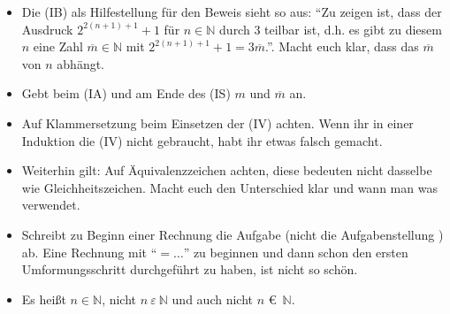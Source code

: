 \documentclass[11pt, a4paper]{article}
\newcommand{\N}{\mathbb{N}}
\begin{document}
\begin{itemize}
\item Die (IB) als Hilfestellung für den Beweis sieht so aus: \enquote{Zu zeigen ist, dass der Ausdruck $2^{2(n+1)+1}+1$ für $n \in \N$ durch 3 teilbar ist, d.h. es gibt zu diesem $n$ eine Zahl $\overline{m} \in \N$ mit $2^{2(n+1)+1}+1 = 3\overline{m}$.}. Macht euch klar, dass das $\overline{m}$ von $n$ abhängt. 

\item Gebt beim (IA) und am Ende des (IS) $m$ und $\overline{m}$ an.

\item Auf Klammersetzung beim Einsetzen der (IV) achten. Wenn ihr in einer Induktion die (IV) nicht gebraucht, habt ihr etwas falsch gemacht.

\item Weiterhin gilt: Auf Äquivalenzzeichen achten, diese bedeuten nicht dasselbe wie Gleichheitszeichen. Macht euch den Unterschied klar und wann man was verwendet.

\item Schreibt zu Beginn einer Rechnung die Aufgabe (nicht die Aufgabenstellung \smiley{}) ab. Eine Rechnung mit \enquote{$= \dots$} zu beginnen und dann schon den ersten Umformungsschritt durchgeführt zu haben, ist nicht so schön.

\item Es heißt $n \in \N$, nicht $n ~\varepsilon~ \N$ und auch nicht $n$ \euro ~$\N$.
\end{itemize}











\newpage
\end{document}
